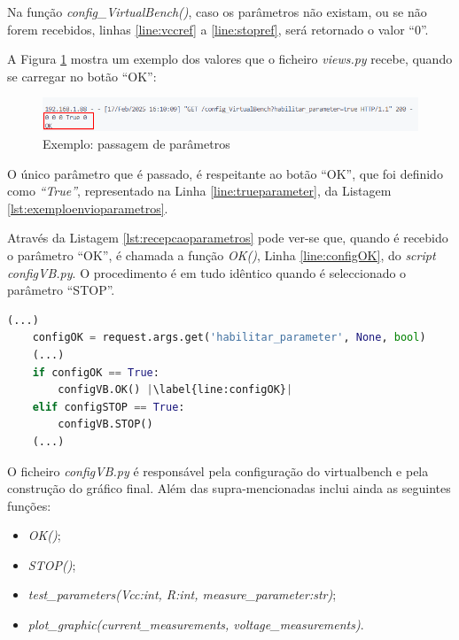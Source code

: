 Na função \textit{config\_VirtualBench()}, caso os parâmetros não existam, ou se não forem recebidos, linhas \ref{line:vccref} a \ref{line:stopref}, será retornado o valor ``0''.

A Figura \ref{fig:passagemparametros} mostra um exemplo dos valores que o ficheiro \textit{views.py} recebe, quando se carregar no botão ``OK'':
\begin{figure}[hbtp]
	\centering
	\includegraphics[width=1\textwidth]{figures/exemplo_dados_Ohm.png}
	\caption{Exemplo: passagem de parâmetros}
	\label{fig:passagemparametros}
\end{figure}

O único parâmetro que é passado, é respeitante ao botão ``OK'', que foi definido como \textit{``True''}, representado na Linha \ref{line:trueparameter}, da Listagem \ref{lst:exemploenvioparametros}.

Através da Listagem \ref{lst:recepcaoparametros} pode ver-se que, quando é recebido o parâmetro ``OK'', é chamada a função \textit{OK()}, Linha \ref{line:configOK}, do \textit{script} \textit{configVB.py}. O procedimento é em tudo idêntico quando é seleccionado o parâmetro ``STOP''.

\begin{minipage}{0.9\linewidth}
	\begin{lstlisting}[language=python, escapechar=|, caption=Teste do parâmetro ``OK'' (\ldots e ``STOP'') no ficheiro \textit{views.py}, label=lst:recepcaoparametros]
	(...)
	configOK = request.args.get('habilitar_parameter', None, bool)
	(...)
	if configOK == True:
        configVB.OK() |\label{line:configOK}|  
    elif configSTOP == True:
        configVB.STOP()	
	(...)
	\end{lstlisting}
\end{minipage}

O ficheiro \textit{configVB.py} é responsável pela configuração do \acrshort{virtualbench} e pela construção do gráfico final. Além das supra-mencionadas inclui ainda as seguintes funções:
\begin{itemize}
	\item \textit{OK()};
	\item \textit{STOP()};
	\item \textit{test\_parameters(Vcc:int, R:int, measure\_parameter:str)};
	\item \textit{plot\_graphic(current\_measurements, voltage\_measurements)}.
\end{itemize}

